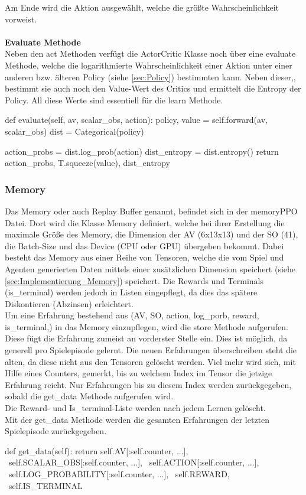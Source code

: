Am Ende wird die Aktion ausgewählt, welche die größte Wahrscheinlichkeit vorweist.\\
\\\textbf{Evaluate Methode}\\
Neben den act Methoden verfügt die ActorCritic Klasse noch über eine evaluate Methode, welche die logarithmierte Wahrscheinlichkeit einer Aktion unter einer anderen bzw. älteren Policy (siehe \ref{sec:Policy}) bestimmten kann. Neben dieser,, bestimmt sie auch noch den Value-Wert des Critics und ermittelt die Entropy der Policy. All diese Werte sind essentiell für die learn Methode.
\begin{python}
    def evaluate(self, av, scalar_obs, action):
		policy, value = self.forward(av, scalar_obs)
		dist = Categorical(policy)
		
		action_probs = dist.log_prob(action)
		dist_entropy = dist.entropy()
		return action_probs, T.squeeze(value), dist_entropy
\end{python}

\subsubsection{Memory}
Das Memory oder auch Replay Buffer genannt, befindet sich in der memoryPPO Datei. Dort wird die Klasse Memory definiert, welche bei ihrer Erstellung die maximale Größe des Memory, die Dimension der AV (6x13x13) und der SO (41), die Batch-Size und das Device (CPU oder GPU) übergeben bekommt.
Dabei besteht das Memory aus einer Reihe von Tensoren, welche die vom Spiel und Agenten generierten Daten mittels einer zusätzlichen Dimension speichert (siehe \ref{sec:Implementierung_Memory}) speichert. Die Rewards und Terminals (is\_terminal) werden jedoch in Listen eingepflegt, da dies das spätere Diskontieren (Abzinsen) erleichtert.\\
Um eine Erfahrung bestehend aus (AV, SO, action, log\_porb, reward, is\_terminal,) in das Memory einzupflegen, wird die store Methode aufgerufen. Diese fügt die Erfahrung zumeist an vorderster Stelle ein. Dies ist möglich, da generell pro Spielepisode gelernt. Die neuen Erfahrungen überschreiben steht die alten, da diese nicht aus den Tensoren gelöscht werden. Viel mehr wird sich, mit Hilfe eines Counters, gemerkt, bis zu welchem Index im Tensor die jetzige Erfahrung reicht. Nur Erfahrungen bis zu diesem Index werden zurückgegeben, sobald die get\_data Methode aufgerufen wird.\\
Die Reward- und Is\_terminal-Liste werden nach jedem Lernen gelöscht.
\\Mit der get\_data Methode werden die gesamten Erfahrungen der letzten Spielepisode zurückgegeben.
\begin{python}
	def get_data(self):
		return self.AV[:self.counter, ...], \
			     self.SCALAR_OBS[:self.counter, ...], \
			     self.ACTION[:self.counter, ...], \
			     self.LOG_PROBABILITY[:self.counter, ...], \
			     self.REWARD, \
			     self.IS_TERMINAL
\end{python}

